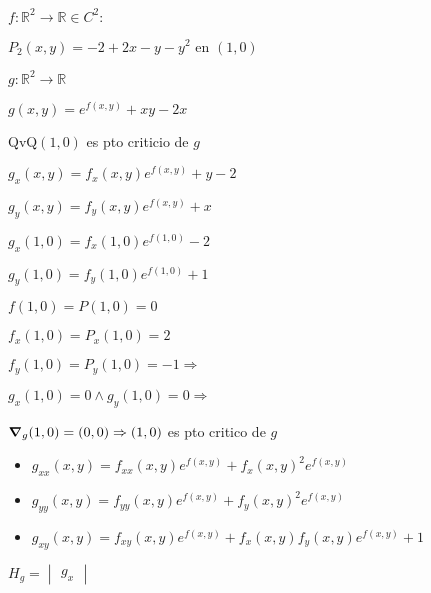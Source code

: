 \documentclass[../parcial.tex]{subfiles}
\begin{document}
    $f: \mathbb{R}^2 \to \mathbb{R} \in C^2 : $

    $P_2(x,y) = -2 + 2x - y - y^2$ en $(1,0)$

    $g: \mathbb{R}^2 \to \mathbb{R}$

    $g(x,y) = e^{f(x,y)} + xy - 2x$

    QvQ$(1,0)$ es pto criticio de $g$

    $g_x(x,y) = f_x(x,y)e^{f(x,y)} + y - 2$

    $g_y(x,y) = f_y(x,y)e^{f(x,y)} + x$

    $g_x(1,0) = f_x(1,0)e^{f(1,0)} - 2$

    $g_y(1,0) = f_y(1,0)e^{f(1,0)} + 1$

    $f(1,0) = P(1,0) = 0$

    $f_x(1,0) = P_x(1,0) = 2$

    $f_y(1,0) = P_y(1,0) = -1 \Rightarrow$

    $g_x(1,0) = 0 \wedge g_y(1,0) = 0 \Rightarrow$

    $\grad_g(1,0) = (0,0) \Rightarrow (1,0)$ es pto critico de $g$

    \begin{itemize}
        \item $g_{xx}(x,y) = f_{xx}(x,y)e^{f(x,y)} + f_x(x,y)^2e^{f(x,y)}$
        \item $g_{yy}(x,y) = f_{yy}(x,y)e^{f(x,y)} + f_y(x,y)^2e^{f(x,y)}$
        \item $g_{xy}(x,y) = f_{xy}(x,y)e^{f(x,y)} + f_x(x,y)f_y(x,y)e^{f(x,y)} + 1$
    \end{itemize}

    $H_g = \begin{vmatrix}
        g_x
    \end{vmatrix}$
\end{document}
